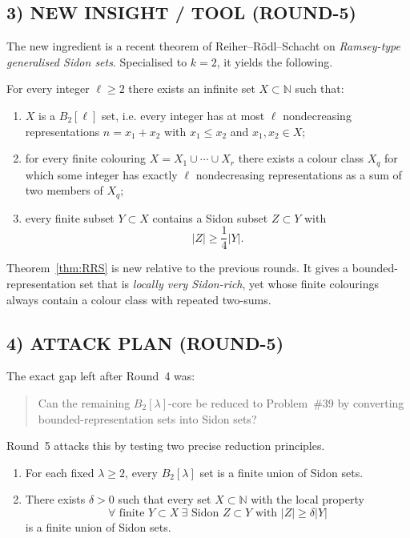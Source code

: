 \subsection*{3) NEW INSIGHT / TOOL (ROUND-5)}
The new ingredient is a recent theorem of Reiher--R\"odl--Schacht on
\emph{Ramsey-type generalised Sidon sets}. Specialised to $k=2$, it yields the following.

\begin{theorem}[External theorem, $k=2$ case]\label{thm:RRS}
For every integer $\ell\ge 2$ there exists an infinite set $X\subset\mathbb N$ such that:
\begin{enumerate}
\item[(i)] $X$ is a $B_2[\ell]$ set, i.e. every integer has at most $\ell$ nondecreasing
representations $n=x_1+x_2$ with $x_1\le x_2$ and $x_1,x_2\in X$;
\item[(ii)] for every finite colouring $X=X_1\cup\cdots\cup X_r$ there exists a colour class
$X_q$ for which some integer has exactly $\ell$ nondecreasing representations as a sum of two
members of $X_q$;
\item[(iii)] every finite subset $Y\subset X$ contains a Sidon subset $Z\subset Y$ with
\[
|Z|\ge \frac14 |Y|.
\]
\end{enumerate}
\end{theorem}

Theorem~\ref{thm:RRS} is new relative to the previous rounds. It gives a bounded-representation
set that is \emph{locally very Sidon-rich}, yet whose finite colourings always contain a colour
class with repeated two-sums.

\subsection*{4) ATTACK PLAN (ROUND-5)}
The exact gap left after Round~4 was:
\begin{quote}
Can the remaining $B_2[\lambda]$-core be reduced to Problem~\#39 by converting bounded-representation
sets into Sidon sets?
\end{quote}

Round~5 attacks this by testing two precise reduction principles.
\begin{enumerate}
\item[(P1)] For each fixed $\lambda\ge 2$, every $B_2[\lambda]$ set is a finite union of Sidon sets.
\item[(P2)] There exists $\delta>0$ such that every set $X\subset\mathbb N$ with the local
property
\[
\forall\text{ finite }Y\subset X\ \exists\text{ Sidon }Z\subset Y\text{ with }|Z|\ge \delta |Y|
\]
is a finite union of Sidon sets.
\end{enumerate}

